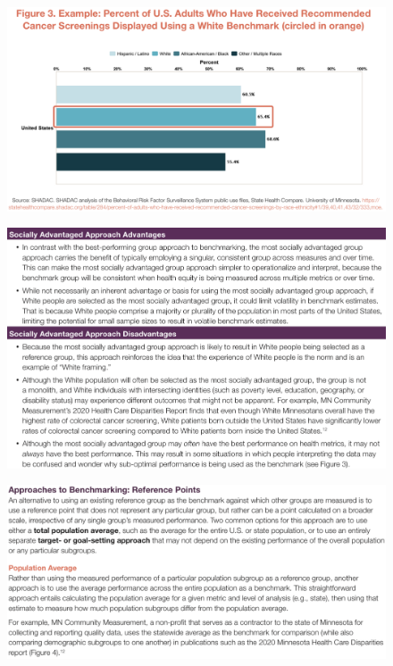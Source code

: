 \documentclass[14pt]{extarticle}
\begin{document}
\begin{figure}[H]
    \centering
    \includegraphics[width=1\textwidth]{fig12.png}
\end{figure}
\begin{figure}[H]
    \centering
    \includegraphics[width=1\textwidth]{fig13.png}
\end{figure}
\begin{figure}[H]
    \centering
    \includegraphics[width=1\textwidth]{fig14.png}
\end{figure}
\end{document}
